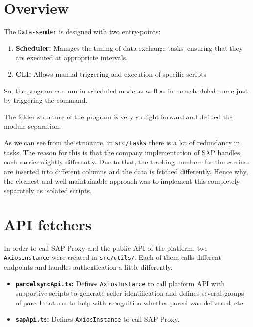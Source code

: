 \section{Overview}

The \texttt{Data-sender} is designed with two entry-points:
\begin{enumerate}
    \item \textbf{Scheduler:} Manages the timing of data exchange tasks, ensuring that they are executed at appropriate intervals.
    \item \textbf{\ac{CLI}:} Allows manual triggering and execution of specific scripts.
\end{enumerate}

So, the program can run in scheduled mode as well as in nonscheduled mode just by triggering the command. 

The folder structure of the program is very straight forward and defined the module separation:

As we can see from the structure, in \texttt{src/tasks} there is a lot of redundancy in tasks.
The reason for this is that the company implementation of SAP handles each carrier slightly differently.
Due to that, the tracking numbers for the carriers are inserted into different columns and the data is fetched differently. 
Hence why, the cleanest and well maintainable approach was to implement this completely separately as isolated scripts.

\section{API fetchers}
In order to call SAP Proxy and the public API of the platform, two \texttt{AxiosInstance} were created in \texttt{src/utils/}.
Each of them calls different endpoints and handles authentication a little differently.
\begin{itemize}
    \item \textbf{\texttt{parcelsyncApi.ts}:} Defines \texttt{AxiosInstance} to call platform API with supportive scripts to generate seller identification and defines several groups of parcel statuses to help with recognition whether parcel was delivered, etc.
    \item \textbf{\texttt{sapApi.ts}:} Defines \texttt{AxiosInstance} to call SAP Proxy.
\end{itemize}


